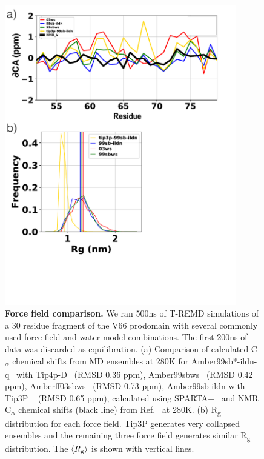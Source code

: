 \documentclass[10pt,letterpaper]{article}
\renewcommand{\figurename}{Fig}
\begin{document}
\renewcommand{\thepage}{S\arabic{page}}  
\renewcommand{\thesection}{S\arabic{section}}   
\renewcommand{\thetable}{S\arabic{table}}   
\renewcommand{\figurename}{}
\renewcommand{\thefigure}{S\arabic{figure} Fig}

\clearpage
\begin{figure}[!ht]
\includegraphics[scale=0.5,width=0.9\textwidth,trim={0 0cm 0 0cm},clip]{../figures/S1.pdf}
\caption{{\bf Force field comparison.} We ran 500ns of T-REMD simulations of a 30 residue fragment of the V66 prodomain with several commonly used force field and water model combinations. The first 200ns of data was discarded as equilibration. (a) Comparison of calculated C\textsubscript{$\alpha$} chemical shifts from MD ensembles at 280K for Amber99sb*-ildn-q~\cite {Lindorff-Larsen2010a, Hornak2006a} with Tip4p-D~\cite{Piana2015} (RMSD 0.36 ppm),  Amber99sbws~\cite{Lindorff-Larsen2010a, Best2014} (RMSD 0.42 ppm), Amberff03sbws~\cite {Best2009, Best2014} (RMSD 0.73 ppm), Amber99sb-ildn with Tip3P ~\cite {Jorgensen1981} (RMSD 0.65 ppm), calculated using SPARTA+~\cite{Shen2010} and NMR C\textsubscript{$\alpha$} chemical shifts (black line) from Ref.~ at 280K. (b) R\textsubscript{g} distribution for each force field. Tip3P generates very collapsed ensembles and the remaining three force field generates similar R\textsubscript{g} distribution. The $\langle R\textsubscript{g} \rangle$ is shown with vertical lines.}
\label{S1} 
\end{figure}
\end{document}
